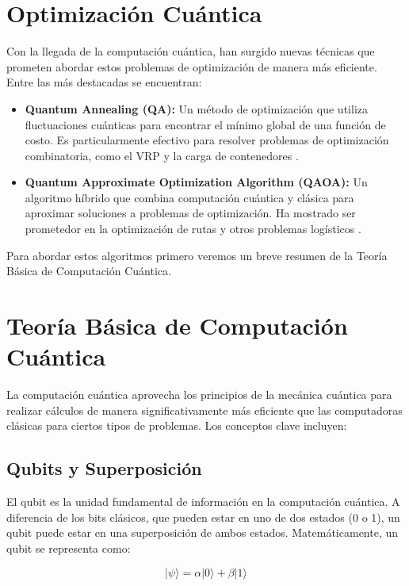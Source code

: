 \documentclass[11pt,a4paper,spanish]{book}
\begin{document}
\section{Optimización Cuántica}

Con la llegada de la computación cuántica, han surgido nuevas técnicas que prometen abordar estos problemas de optimización de manera más eficiente. Entre las más destacadas se encuentran:

\begin{itemize}
	\item \textbf{Quantum Annealing (QA):} Un método de optimización que utiliza fluctuaciones cuánticas para encontrar el mínimo global de una función de costo. Es particularmente efectivo para resolver problemas de optimización combinatoria, como el VRP y la carga de contenedores \cite{phillipson2024}.
	\item \textbf{Quantum Approximate Optimization Algorithm (QAOA):} Un algoritmo híbrido que combina computación cuántica y clásica para aproximar soluciones a problemas de optimización. Ha mostrado ser prometedor en la optimización de rutas y otros problemas logísticos \cite{farhiQuantum}.
\end{itemize}

Para abordar estos algoritmos primero veremos un breve resumen de la Teoría Básica de Computación Cuántica.


\section{Teoría Básica de Computación Cuántica}

La computación cuántica aprovecha los principios de la mecánica cuántica para realizar cálculos de manera significativamente más eficiente que las computadoras clásicas para ciertos tipos de problemas. Los conceptos clave incluyen:

\subsection{Qubits y Superposición}

El qubit es la unidad fundamental de información en la computación cuántica. A diferencia de los bits clásicos, que pueden estar en uno de dos estados (0 o 1), un qubit puede estar en una superposición de ambos estados. Matemáticamente, un qubit se representa como:

\[ \lvert \psi \rangle = \alpha \lvert 0 \rangle + \beta \lvert 1 \rangle \]
\end{document}
